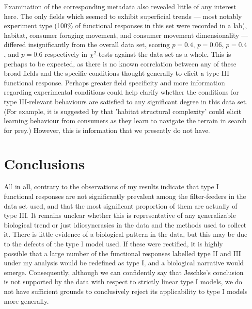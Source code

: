 \documentclass[11pt]{article}
\begin{document}
    Examination of the corresponding metadata also revealed little of any interest here. The only fields which seemed to exhibit superficial trends — most notably experiment type (100\% of functional responses in this set were recorded in a lab), habitat, consumer foraging movement, and consumer movement dimensionality — differed insignificantly from the overall data set, scoring $p=0.4$, $p=0.06$, $p=0.4$, and $p=0.6$ respectively in $\chi^2$-tests against the data set as a whole. This is perhaps to be expected, as there is no known correlation between any of these broad fields and the specific conditions thought generally to elicit a type III functional response. Perhaps greater field specificity and more information regarding experimental conditions could help clarify whether the conditions for type III-relevant behaviours are satisfied to any significant degree in this data set. (For example, it is suggested by \citet{pawar2012dimensionality} that 'habitat structural complexity' could elicit learning behaviour from consumers as they learn to navigate the terrain in search for prey.) However, this is information that we presently do not have.
    
    \section{Conclusions}
    
    All in all, contrary to the observations of \citet{jeschke2004consumer} my results indicate that type I functional responses are not significantly prevalent among the filter-feeders in the data set used, and that the most significant proportion of them are actually of type III. It remains unclear whether this is representative of any generalizable biological trend or just idiosyncrasies in the data and the methods used to collect it. There is little evidence of a biological pattern in the data, but this may be due to the defects of the type I model used. If these were rectified, it is highly possible that a large number of the functional responses labelled type II and III under my analysis would be redefined as type I, and a biological narrative would emerge. Consequently, although we can confidently say that Jeschke's conclusion is not supported by the data with respect to strictly linear type I models, we do not have sufficient grounds to conclusively reject its applicability to type I models more generally.

    \newpage
    
    
\end{document}
